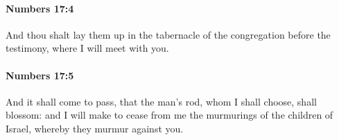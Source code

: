 		\paragraph{Numbers 17:4} %
			\label{NUMBERS-17-4}

			And thou shalt lay them up in the tabernacle of the congregation before the testimony, where I will meet with you.


		\paragraph{Numbers 17:5} %
			\label{NUMBERS-17-5}

			And it shall come to pass, that the man’s rod, whom I shall choose, shall blossom: and I will make to cease from me the murmurings of the children of Israel, whereby they murmur against you.


